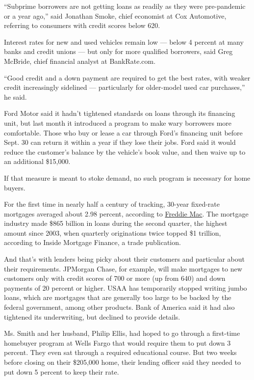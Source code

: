 ``Subprime borrowers are not getting loans as readily as they were
pre-pandemic or a year ago,'' said Jonathan Smoke, chief economist at
Cox Automotive, referring to consumers with credit scores below 620.

Interest rates for new and used vehicles remain low --- below 4 percent
at many banks and credit unions --- but only for more qualified
borrowers, said Greg McBride, chief financial analyst at BankRate.com.

``Good credit and a down payment are required to get the best rates,
with weaker credit increasingly sidelined --- particularly for
older-model used car purchases,'' he said.

Ford Motor said it hadn't tightened standards on loans through its
financing unit, but last month it introduced a program to make wary
borrowers more comfortable. Those who buy or lease a car through Ford's
financing unit before Sept. 30 can return it within a year if they lose
their jobs. Ford said it would reduce the customer's balance by the
vehicle's book value, and then waive up to an additional \$15,000.

If that measure is meant to stoke demand, no such program is necessary
for home buyers.

For the first time in nearly half a century of tracking, 30-year
fixed-rate mortgages averaged about 2.98 percent, according to
\href{https://freddiemac.gcs-web.com/news-releases/news-release-details/mortgage-rates-fall-below-three-percent}{Freddie
Mac}. The mortgage industry made \$865 billion in loans during the
second quarter, the highest amount since 2003, when quarterly
originations twice topped \$1 trillion, according to Inside Mortgage
Finance, a trade publication.

And that's with lenders being picky about their customers and particular
about their requirements. JPMorgan Chase, for example, will make
mortgages to new customers only with credit scores of 700 or more (up
from 640) and down payments of 20 percent or higher. USAA has
temporarily stopped writing jumbo loans, which are mortgages that are
generally too large to be backed by the federal government, among other
products. Bank of America said it had also tightened its underwriting,
but declined to provide details.

Ms. Smith and her husband, Philip Ellis, had hoped to go through a
first-time homebuyer program at Wells Fargo that would require them to
put down 3 percent. They even sat through a required educational course.
But two weeks before closing on their \$205,000 home, their lending
officer said they needed to put down 5 percent to keep their rate.

